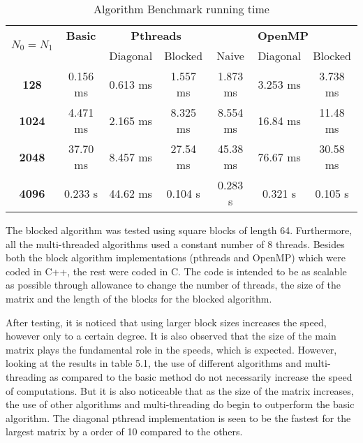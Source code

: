 \documentclass[10pt,journal]{article}
\begin{document}
\begin{table}
\centering
\caption{\label{tab:table-name}Algorithm Benchmark running time}
\begin{tabular}{|c|c|c|c|c|c|c|}

\hline

\multirow{2}{*}{\textbf{$N_{0}=N_{1}$}} & \textbf{Basic} & \multicolumn{2}{c|}{\textbf{Pthreads}} & \multicolumn{3}{c|}{\textbf{OpenMP}} \\ \cline{2-7} 
                                    &                & Diagonal           & Blocked           & Naive       & Diagonal            & Blocked           \\ \hline
\textbf{128}                        & 0.156 ms       & 0.613 ms           & 1.557 ms          & 1.873 ms       & 3.253 ms            & 3.738 ms          \\ \hline
\textbf{1024}                       & 4.471 ms       & 2.165 ms           & 8.325 ms          & 8.554 ms           & 16.84 ms            & 11.48 ms          \\ \hline
\textbf{2048}                       & 37.70 ms       & 8.457 ms           & 27.54 ms          & 45.38 ms             & 76.67 ms            & 30.58 ms           \\ \hline
\textbf{4096}                       & 0.233 s        & 44.62 ms            & 0.104 s          & 0.283 s            & 0.321 s             & 0.105 s           \\ \hline
\end{tabular}
\end{table}


The blocked algorithm was tested using square blocks of length 64. Furthermore, all the multi-threaded algorithms used a constant number of 8 threads. Besides both the block algorithm implementations (pthreads and OpenMP) which were coded in C++, the rest were coded in C. The code is intended to be as scalable as possible through allowance to change the number of threads, the size of the matrix and the length of the blocks for the blocked algorithm. 
\newline

After testing, it is noticed that using larger block sizes increases the speed, however only to a certain degree. It is also observed that the size of the main matrix plays the fundamental role in the speeds, which is expected. However, looking at the results in table 5.1, the use of different algorithms and multi-threading as compared to the basic method do not necessarily increase the speed of computations. But it is also noticeable that as the size of the matrix increases, the use of other algorithms and multi-threading do begin to outperform the basic algorithm. The diagonal pthread implementation is seen to be the fastest for the largest matrix by a order of 10 compared to the others.\\
\end{document}
